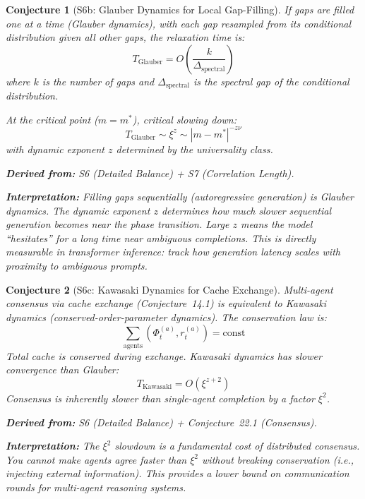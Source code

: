 \documentclass[11pt,letterpaper]{article}
\newtheorem{conjecture}{Conjecture}[section]
\begin{document}
\begin{conjecture}[S6b: Glauber Dynamics for 
Local Gap-Filling]\label{conj:glauber}
If gaps are filled one at a time (Glauber dynamics), with each gap 
resampled from its conditional distribution given all other gaps, the 
relaxation time is:
\begin{equation}
    T_{\mathrm{Glauber}} = O\left(\frac{k}
    {\Delta_{\mathrm{spectral}}}\right)
\end{equation}
where $k$ is the number of gaps and $\Delta_{\mathrm{spectral}}$ is the 
spectral gap of the conditional distribution.

At the critical point ($m = m^*$), critical slowing down:
\begin{equation}
    T_{\mathrm{Glauber}} \sim \xi^z \sim |m - m^*|^{-z\nu}
\end{equation}
with dynamic exponent $z$ determined by the universality class.

\textbf{Derived from:} S6 (Detailed Balance) + S7 (Correlation Length).

\textbf{Interpretation:} Filling gaps sequentially (autoregressive 
generation) is Glauber dynamics. The dynamic exponent $z$ determines 
how much slower sequential generation becomes near the phase transition. 
Large $z$ means the model ``hesitates'' for a long time near ambiguous 
completions. This is directly measurable in transformer inference: track 
how generation latency scales with proximity to ambiguous prompts.
\end{conjecture}

\begin{conjecture}[S6c: Kawasaki Dynamics for Cache 
Exchange]\label{conj:kawasaki}
Multi-agent consensus via cache exchange (Conjecture~14.1) is equivalent 
to Kawasaki dynamics (conserved-order-parameter dynamics). The 
conservation law is:
\begin{equation}
    \sum_{\text{agents}} (\Phi_t^{(a)}, r_t^{(a)}) = \text{const}
\end{equation}
Total cache is conserved during exchange. Kawasaki dynamics has slower 
convergence than Glauber:
\begin{equation}
    T_{\mathrm{Kawasaki}} = O\left(\xi^{z+2}\right)
\end{equation}
Consensus is inherently slower than single-agent completion by a factor 
$\xi^2$.

\textbf{Derived from:} S6 (Detailed Balance) + Conjecture~22.1 
(Consensus).

\textbf{Interpretation:} The $\xi^2$ slowdown is a fundamental cost of 
distributed consensus. You cannot make agents agree faster than $\xi^2$ 
without breaking conservation (i.e., injecting external information). 
This provides a lower bound on communication rounds for multi-agent 
reasoning systems.
\end{conjecture}
\end{document}
